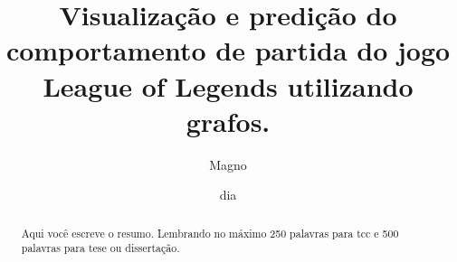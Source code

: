 \documentclass[tg]{mdtufsm}
\title{Visualização e predição do comportamento de partida do jogo League of Legends utilizando grafos. }
\author{Magno}{Guilherme}
\institute{Centro de Tecnologia}
\date{dia}{mês}{2018}
\begin{document}
	
	

\maketitle

\restoregeometry

	
\makeapprove




\begin{abstract}
		
Aqui você escreve o resumo. Lembrando no máximo 250 palavras para tcc e 500 palavras para tese ou dissertação.

\end{abstract}
\end{document}
